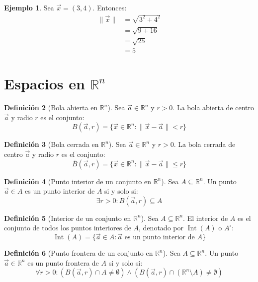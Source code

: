 \documentclass{article}
\newcommand{\R}{\mathbb{R}}
\newcommand{\vect}[1]{\vec{#1}}
\newcommand{\norm}[1]{\| #1 \|}
\theoremstyle{definition}
\newtheorem{definition}{Definición}[section]
\newtheorem{example}[definition]{Ejemplo}
\theoremstyle{plain}
\theoremstyle{remark}
\theoremstyle{corollary}
\begin{document}
\begin{example}
  
Sea $\vect{x} = (3, 4)$. Entonces:
\begin{align*}
\norm{\vect{x}} &= \sqrt{3^2 + 4^2} \\
&= \sqrt{9 + 16} \\
&= \sqrt{25} \\
&= 5
\end{align*}

\end{example}

\section{Espacios en $\R^n$}

\begin{definition}[Bola abierta en $\R^n$]

Sea $\vect{a} \in \R^n$ y $r > 0$. La bola abierta de centro $\vect{a}$ y radio $r$ es el conjunto:
\[
B(\vect{a}, r) = \{ \vect{x} \in \R^n : \norm{\vect{x} - \vect{a}} < r \}
\]
\end{definition}

\begin{definition}[Bola cerrada en $\R^n$]

Sea $\vect{a} \in \R^n$ y $r > 0$. La bola cerrada de centro $\vect{a}$ y radio $r$ es el conjunto:
\[
\overline{B}(\vect{a}, r) = \{ \vect{x} \in \R^n : \norm{\vect{x} - \vect{a}} \leq r \}
\]
\end{definition}

\begin{definition}[Punto interior de un conjunto en $\R^n$]

Sea $A \subseteq \R^n$. Un punto $\vect{a} \in A$ es un punto interior de $A$ si y solo si:
\[
\exists r > 0 : B(\vect{a}, r) \subseteq A
\]
\end{definition}

\begin{definition}[Interior de un conjunto en $\R^n$]

Sea $A \subseteq \R^n$. El interior de $A$ es el conjunto de todos los puntos interiores de $A$, denotado por $\operatorname{Int}(A)$ o $A^\circ$:
\[
\operatorname{Int}(A) = \{ \vect{a} \in A : \vect{a} \text{ es un punto interior de } A \}
\]
\end{definition}

\begin{definition}[Punto frontera de un conjunto en $\R^n$]

Sea $A \subseteq \R^n$. Un punto $\vect{a} \in \R^n$ es un punto frontera de $A$ si y solo si:
\[
\forall r > 0 : (B(\vect{a}, r) \cap A \neq \emptyset) \wedge (B(\vect{a}, r) \cap (\R^n \setminus A) \neq \emptyset)
\]
\end{definition}
\end{document}

